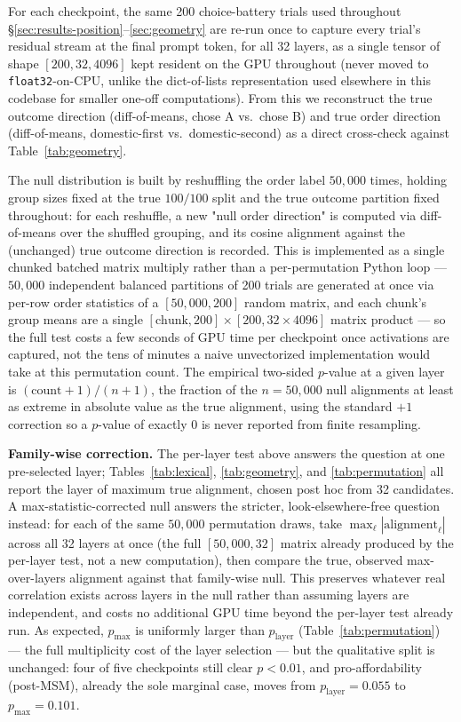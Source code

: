 \documentclass{article}
\begin{document}
For each checkpoint, the same 200 choice-battery trials used throughout \S\ref{sec:results-position}--\ref{sec:geometry} are re-run once to capture every trial's residual stream at the final prompt token, for all 32 layers, as a single tensor of shape $[200, 32, 4096]$ kept resident on the GPU throughout (never moved to \texttt{float32}-on-CPU, unlike the dict-of-lists representation used elsewhere in this codebase for smaller one-off computations). From this we reconstruct the true outcome direction (diff-of-means, chose A vs.\ chose B) and true order direction (diff-of-means, domestic-first vs.\ domestic-second) as a direct cross-check against Table~\ref{tab:geometry}.

The null distribution is built by reshuffling the order label $50{,}000$ times, holding group sizes fixed at the true $100/100$ split and the true outcome partition fixed throughout: for each reshuffle, a new "null order direction" is computed via diff-of-means over the shuffled grouping, and its cosine alignment against the (unchanged) true outcome direction is recorded. This is implemented as a single chunked batched matrix multiply rather than a per-permutation Python loop --- $50{,}000$ independent balanced partitions of 200 trials are generated at once via per-row order statistics of a $[50{,}000, 200]$ random matrix, and each chunk's group means are a single $[\text{chunk}, 200] \times [200, 32{\times}4096]$ matrix product --- so the full test costs a few seconds of GPU time per checkpoint once activations are captured, not the tens of minutes a naive unvectorized implementation would take at this permutation count. The empirical two-sided $p$-value at a given layer is $(\text{count}+1)/(n+1)$, the fraction of the $n{=}50{,}000$ null alignments at least as extreme in absolute value as the true alignment, using the standard $+1$ correction so a $p$-value of exactly $0$ is never reported from finite resampling.

\textbf{Family-wise correction.} The per-layer test above answers the question at one pre-selected layer; Tables~\ref{tab:lexical}, \ref{tab:geometry}, and \ref{tab:permutation} all report the layer of maximum true alignment, chosen post hoc from 32 candidates. A max-statistic-corrected null answers the stricter, look-elsewhere-free question instead: for each of the same $50{,}000$ permutation draws, take $\max_\ell |\text{alignment}_\ell|$ across all 32 layers at once (the full $[50{,}000, 32]$ matrix already produced by the per-layer test, not a new computation), then compare the true, observed max-over-layers alignment against that family-wise null. This preserves whatever real correlation exists across layers in the null rather than assuming layers are independent, and costs no additional GPU time beyond the per-layer test already run. As expected, $p_{\max}$ is uniformly larger than $p_{\text{layer}}$ (Table~\ref{tab:permutation}) --- the full multiplicity cost of the layer selection --- but the qualitative split is unchanged: four of five checkpoints still clear $p<0.01$, and pro-affordability (post-MSM), already the sole marginal case, moves from $p_{\text{layer}}{=}0.055$ to $p_{\max}{=}0.101$.
\end{document}
